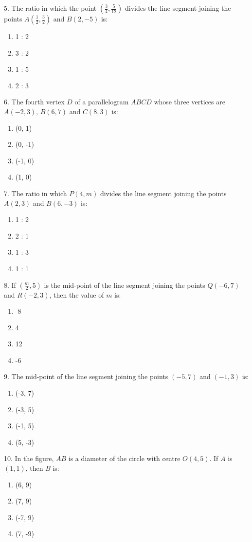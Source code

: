 \documentclass[12pt]{article}
\begin{document}
\begin{multicols}{2}
	5. The ratio in which the point $\left(\frac{3}{4}, \frac{5}{12}\right)$ divides the line segment joining the points $A\left(\frac{1}{2}, \frac{3}{2}\right)$ and $B(2, -5)$ is:
	\begin{enumerate}
		\item 1 : 2
		\item 3 : 2
		\item 1 : 5
		\item 2 : 3
	\end{enumerate}
	
	6. The fourth vertex $D$ of a parallelogram $ABCD$ whose three vertices are $A(-2, 3)$, $B(6, 7)$ and $C(8, 3)$ is:
	\begin{enumerate}
		\item (0, 1)
		\item (0, -1)
		\item (-1, 0)
		\item (1, 0)
	\end{enumerate}
	
	7. The ratio in which $P(4, m)$ divides the line segment joining the points $A(2, 3)$ and $B(6, -3)$ is:
	\begin{enumerate}
		\item 1 : 2
		\item 2 : 1
		\item 1 : 3
		\item 1 : 1
	\end{enumerate}
	
	8. If $\left(\frac{m}{2}, 5\right)$ is the mid-point of the line segment joining the points $Q(-6, 7)$ and $R(-2, 3)$, then the value of $m$ is:
	\begin{enumerate}
		\item -8
		\item 4
		\item 12
		\item -6
	\end{enumerate}
	
	9. The mid-point of the line segment joining the points $(-5, 7)$ and $(-1, 3)$ is:
	\begin{enumerate}
		\item (-3, 7)
		\item (-3, 5)
		\item (-1, 5)
		\item (5, -3)
	\end{enumerate}
	
	10. In the figure, $AB$ is a diameter of the circle with centre $O(4, 5)$. If $A$ is $(1, 1)$, then $B$ is:
	\begin{enumerate}
		\item (6, 9)
		\item (7, 9)
		\item (-7, 9)
		\item (7, -9)
	\end{enumerate}
	

\end{multicols}
\end{document}
